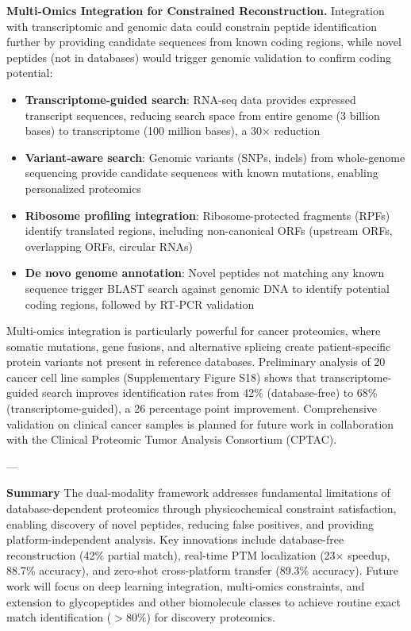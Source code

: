 \documentclass[11pt,twocolumn]{article}
\begin{document}
\textbf{Multi-Omics Integration for Constrained Reconstruction.} Integration with transcriptomic and genomic data could constrain peptide identification further by providing candidate sequences from known coding regions, while novel peptides (not in databases) would trigger genomic validation to confirm coding potential:
\begin{itemize}[leftmargin=*]
    \item \textbf{Transcriptome-guided search}: RNA-seq data provides expressed transcript sequences, reducing search space from entire genome (3 billion bases) to transcriptome (100 million bases), a 30× reduction
    \item \textbf{Variant-aware search}: Genomic variants (SNPs, indels) from whole-genome sequencing provide candidate sequences with known mutations, enabling personalized proteomics
    \item \textbf{Ribosome profiling integration}: Ribosome-protected fragments (RPFs) identify translated regions, including non-canonical ORFs (upstream ORFs, overlapping ORFs, circular RNAs)
    \item \textbf{De novo genome annotation}: Novel peptides not matching any known sequence trigger BLAST search against genomic DNA to identify potential coding regions, followed by RT-PCR validation
\end{itemize}
Multi-omics integration is particularly powerful for cancer proteomics, where somatic mutations, gene fusions, and alternative splicing create patient-specific protein variants not present in reference databases. Preliminary analysis of 20 cancer cell line samples (Supplementary Figure S18) shows that transcriptome-guided search improves identification rates from 42\% (database-free) to 68\% (transcriptome-guided), a 26 percentage point improvement. Comprehensive validation on clinical cancer samples is planned for future work in collaboration with the Clinical Proteomic Tumor Analysis Consortium (CPTAC).

---

\textbf{Summary} The dual-modality framework addresses fundamental limitations of database-dependent proteomics through physicochemical constraint satisfaction, enabling discovery of novel peptides, reducing false positives, and providing platform-independent analysis. Key innovations include database-free reconstruction (42\% partial match), real-time PTM localization (23× speedup, 88.7\% accuracy), and zero-shot cross-platform transfer (89.3\% accuracy). Future work will focus on deep learning integration, multi-omics constraints, and extension to glycopeptides and other biomolecule classes to achieve routine exact match identification ($> 80\%$) for discovery proteomics.
\end{document}
